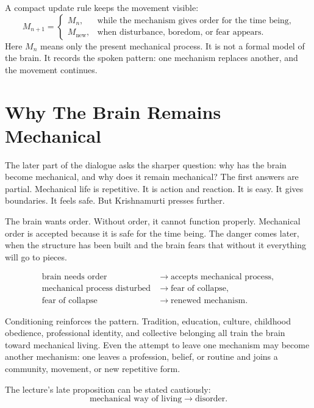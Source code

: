 \documentclass[11pt,oneside]{book}
\begin{document}
A compact update rule keeps the movement visible:
\begin{equation}
M_{n+1}
=
\begin{cases}
M_n, & \text{while the mechanism gives order for the time being},\\
M_{\mathrm{new}}, & \text{when disturbance, boredom, or fear appears}.
\end{cases}
\end{equation}
Here \(M_n\) means only the present mechanical process. It is not a formal model of the brain. It records the spoken pattern: one mechanism replaces another, and the movement continues.

\section{Why The Brain Remains Mechanical}

The later part of the dialogue asks the sharper question: why has the brain become mechanical, and why does it remain mechanical? The first answers are partial. Mechanical life is repetitive. It is action and reaction. It is easy. It gives boundaries. It feels safe. But Krishnamurti presses further.

The brain wants order. Without order, it cannot function properly. Mechanical order is accepted because it is safe for the time being. The danger comes later, when the structure has been built and the brain fears that without it everything will go to pieces.

\begin{align}
\text{brain needs order}
&\longrightarrow
\text{accepts mechanical process},\\
\text{mechanical process disturbed}
&\longrightarrow
\text{fear of collapse},\\
\text{fear of collapse}
&\longrightarrow
\text{renewed mechanism}.
\end{align}

Conditioning reinforces the pattern. Tradition, education, culture, childhood obedience, professional identity, and collective belonging all train the brain toward mechanical living. Even the attempt to leave one mechanism may become another mechanism: one leaves a profession, belief, or routine and joins a community, movement, or new repetitive form.

The lecture's late proposition can be stated cautiously:
\begin{equation}
\text{mechanical way of living}
\longrightarrow
\text{disorder}.
\end{equation}
\end{document}
